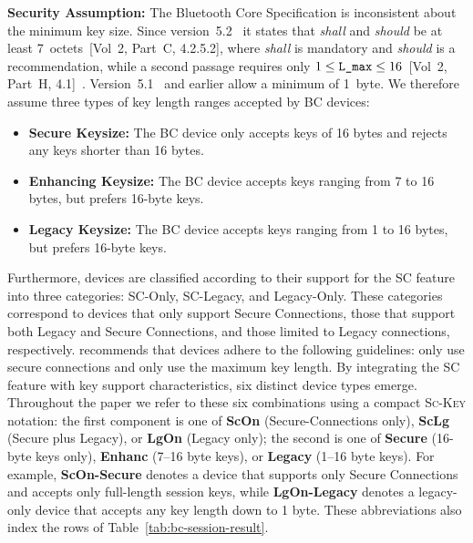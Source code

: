 \noindent
\textbf{Security Assumption:} 
The Bluetooth Core Specification is inconsistent about the minimum key size. Since
version~5.2~\cite{bluetooth52} it states that  \emph{shall} and 
\emph{should} be at least 7~octets~[Vol~2, Part~C, 4.2.5.2], where \emph{shall} is mandatory and
\emph{should} is a recommendation, while a second passage requires only $1 \leq
\text{{\ttfamily L\_max}} \leq 16$~[Vol~2, Part~H, 4.1]~\cite{bluetooth6}.
Version~5.1~\cite{bluetooth51} and earlier allow a minimum of 1~byte.
We therefore assume three types of key length ranges accepted by BC devices:
\begin{itemize}[leftmargin=*]
    \item \textbf{Secure Keysize:} The BC device only accepts keys of 16 bytes and rejects any keys shorter than 16 bytes.
    \item \textbf{Enhancing Keysize:} The BC device accepts keys ranging from 7 to 16 bytes, but prefers 16-byte keys.
    \item \textbf{Legacy Keysize:} The BC device accepts keys ranging from 1 to 16 bytes, but prefers 16-byte keys.
\end{itemize}
Furthermore, devices are classified according to their support for the SC feature into three categories: SC-Only, SC-Legacy, and Legacy-Only.
These categories correspond to devices that only support Secure Connections, those that support both Legacy and Secure Connections, and those limited to Legacy connections, respectively.
\cite{padgette2017guide} recommends that devices adhere to the following guidelines: only use secure connections and only use the maximum key length.
By integrating the SC feature with key support characteristics, six distinct device types emerge.
Throughout the paper we refer to these six combinations using a compact \textsc{Sc}-\textsc{Key} notation: the first component is one of \textbf{ScOn} (Secure-Connections only), \textbf{ScLg} (Secure plus Legacy), or \textbf{LgOn} (Legacy only); the second is one of \textbf{Secure} (16-byte keys only), \textbf{Enhanc} (7--16 byte keys), or \textbf{Legacy} (1--16 byte keys).
For example, \textbf{ScOn-Secure} denotes a device that supports only Secure Connections and accepts only full-length session keys, while \textbf{LgOn-Legacy} denotes a legacy-only device that accepts any key length down to 1 byte.
These abbreviations also index the rows of Table~\ref{tab:bc-session-result}.

